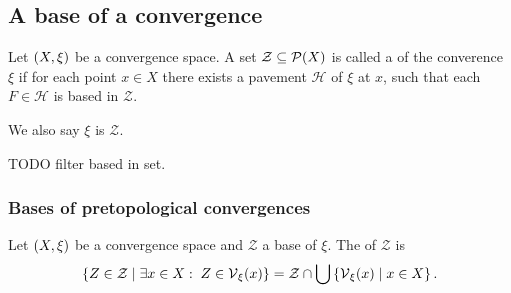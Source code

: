 \subsection{A base of a convergence}
\begin{definition}
Let $\left( X,\xi \right)$ be a convergence space. A set $\mathcal{Z}\subseteq \operatorname{\mathcal{P}}(X)$ is called a  of the converence $\xi$ if for each point $x\in X$ there exists a pavement $\mathcal{H}$ of $\xi$ at $x$, such that each $F\in\mathcal{H}$ is based in $\mathcal{Z}$.

We also say $\xi$ is  $\mathcal{Z}$.
\end{definition}
TODO filter based in set.



\subsubsection{Bases of pretopological convergences}
\begin{definition}
Let $\left( X,\xi \right)$ be a convergence space and $\mathcal{Z}$ a base of $\xi$. The  of $\mathcal{Z}$ is
\[ \left\{ Z\in \mathcal{Z} \;\middle|\; \exists x\in X: \; Z\in \operatorname{\mathcal{V}}_\xi(x) \right\} = \mathcal{Z}\cap \bigcup\left\{ \operatorname{\mathcal{V}}_\xi(x) \;\middle|\; x\in X \right\}. \]
\end{definition}

